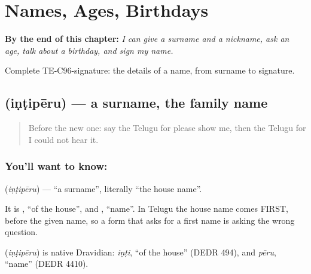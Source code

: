 
\chapter{Names, Ages, Birthdays}
\label{ch:te-names-ages-birthdays}

\begin{chapteropening}
\textbf{By the end of this chapter:} \emph{I can give a surname and a nickname, ask an age, talk about a birthday, and sign my name.}

Complete TE-C96-signature: the details of a name, from surname to signature.
\end{chapteropening}

\section[\texorpdfstring{\te{ఇంటిపేరు} (iṇṭipēru)}{ఇంటిపేరు (iṇṭipēru)}]{ (iṇṭipēru) — a surname, the family name}

\label{lesson:TE-C96-surname}



\begin{quote}
Before the new one: say the Telugu for please show me, then the Telugu for I could not hear it.
\end{quote}

\subsection*{You'll want to know: }
\textbf{} (\emph{iṇṭipēru}) — \textquotedblleft{}a surname\textquotedblright{}, literally \textquotedblleft{}the house name\textquotedblright{}.

It is \textbf{}, \textquotedblleft{}of the house\textquotedblright{}, and \textbf{}, \textquotedblleft{}name\textquotedblright{}. In Telugu the house name comes FIRST, before the given name, so a form that asks for a first name is asking the wrong question.

\begin{cousinweb}
\textbf{} (\emph{iṇṭipēru}) is native Dravidian: \emph{iṇṭi}, \textquotedblleft{}of the house\textquotedblright{} (DEDR 494), and \emph{pēru}, \textquotedblleft{}name\textquotedblright{} (DEDR 4410).
\end{cousinweb}

